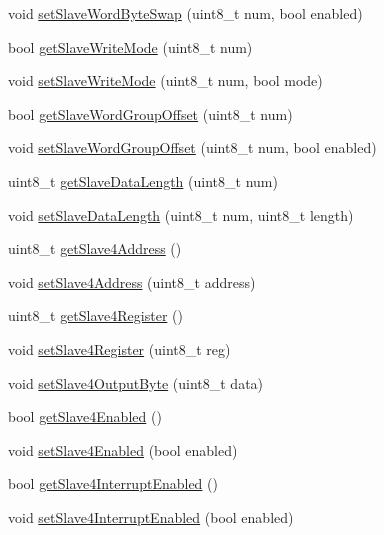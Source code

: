 \begin{DoxyCompactItemize}
\item 
void \mbox{\hyperlink{classMPU6050_abeb1f83652066d7543fd3283af794364}{set\+Slave\+Word\+Byte\+Swap}} (uint8\+\_\+t num, bool enabled)
\item 
bool \mbox{\hyperlink{classMPU6050_adb99955fa66300b1f0bedfcdd8187412}{get\+Slave\+Write\+Mode}} (uint8\+\_\+t num)
\item 
void \mbox{\hyperlink{classMPU6050_a3d9bfcb5394c7a382009cd2dc91ce801}{set\+Slave\+Write\+Mode}} (uint8\+\_\+t num, bool mode)
\item 
bool \mbox{\hyperlink{classMPU6050_a32ce8023bb80afc5d55811de70c7214f}{get\+Slave\+Word\+Group\+Offset}} (uint8\+\_\+t num)
\item 
void \mbox{\hyperlink{classMPU6050_a32602ab86f70b70d3313628fc6c010ae}{set\+Slave\+Word\+Group\+Offset}} (uint8\+\_\+t num, bool enabled)
\item 
uint8\+\_\+t \mbox{\hyperlink{classMPU6050_a54c2a48b3cb79106bcaf75accf6cd311}{get\+Slave\+Data\+Length}} (uint8\+\_\+t num)
\item 
void \mbox{\hyperlink{classMPU6050_ab4151353f433c533246d938fc3b78458}{set\+Slave\+Data\+Length}} (uint8\+\_\+t num, uint8\+\_\+t length)
\item 
uint8\+\_\+t \mbox{\hyperlink{classMPU6050_a4278dec5fec25be9a6f45b51a3373ad2}{get\+Slave4\+Address}} ()
\item 
void \mbox{\hyperlink{classMPU6050_a6985da2cbc37be3fefbe3c16bf8d34a6}{set\+Slave4\+Address}} (uint8\+\_\+t address)
\item 
uint8\+\_\+t \mbox{\hyperlink{classMPU6050_a7bd548cb60ecceb27c72f026ec0a60f8}{get\+Slave4\+Register}} ()
\item 
void \mbox{\hyperlink{classMPU6050_ae54dc358da048e61a1ac68012300fdaa}{set\+Slave4\+Register}} (uint8\+\_\+t reg)
\item 
void \mbox{\hyperlink{classMPU6050_a17147a6f477be79f58889e9e6329392f}{set\+Slave4\+Output\+Byte}} (uint8\+\_\+t data)
\item 
bool \mbox{\hyperlink{classMPU6050_a4b9e13d6776ba99e042773873557bedd}{get\+Slave4\+Enabled}} ()
\item 
void \mbox{\hyperlink{classMPU6050_a04be2a8c3af6ef174f97769b9b5164a9}{set\+Slave4\+Enabled}} (bool enabled)
\item 
bool \mbox{\hyperlink{classMPU6050_a051549bcfa2eeb848c8557fc3efe74da}{get\+Slave4\+Interrupt\+Enabled}} ()
\item 
void \mbox{\hyperlink{classMPU6050_a7d7498ebc26f8a1fe8c9dcf40cd5d265}{set\+Slave4\+Interrupt\+Enabled}} (bool enabled)

\end{DoxyCompactItemize}
